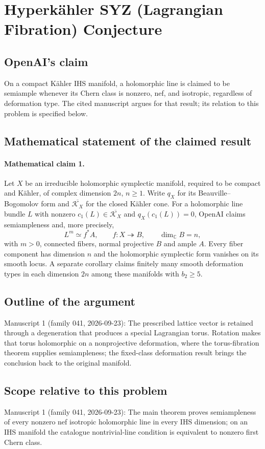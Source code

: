 \documentclass[11pt]{article}
\begin{document}
\section*{Hyperkähler SYZ (Lagrangian Fibration) Conjecture}

\subsection{OpenAI's claim}
On a compact Kähler IHS manifold, a holomorphic line is claimed to be semiample whenever its Chern class is nonzero, nef, and isotropic, regardless of deformation type. The cited manuscript argues for that result; its relation to this problem is specified below.

\subsection{Mathematical statement of the claimed result}
\paragraph{Mathematical claim 1.} Let $X$ be an irreducible holomorphic symplectic manifold, required to be compact and Kähler, of complex dimension $2n$, $n\ge1$. Write $q_X$ for its Beauville--Bogomolov form and $\overline{\mathcal K_X}$ for the closed Kähler cone. For a holomorphic line bundle $L$ with nonzero $c_1(L)\in\overline{\mathcal K_X}$ and $q_X(c_1(L))=0$, OpenAI claims semiampleness and, more precisely,
\[
L^m\simeq f^*A,\qquad f:X\twoheadrightarrow B,\qquad\dim_{\mathbb C}B=n,
\]
with $m>0$, connected fibers, normal projective $B$ and ample $A$. Every fiber component has dimension $n$ and the holomorphic symplectic form vanishes on its smooth locus. A separate corollary claims finitely many smooth deformation types in each dimension $2n$ among these manifolds with $b_2\ge5$.

\subsection{Outline of the argument}
Manuscript 1 (family 041, 2026-09-23): The prescribed lattice vector is retained through a degeneration that produces a special Lagrangian torus. Rotation makes that torus holomorphic on a nonprojective deformation, where the torus-fibration theorem supplies semiampleness; the fixed-class deformation result brings the conclusion back to the original manifold.

\subsection{Scope relative to this problem}
Manuscript 1 (family 041, 2026-09-23): The main theorem proves semiampleness of every nonzero nef isotropic holomorphic line in every IHS dimension; on an IHS manifold the catalogue nontrivial-line condition is equivalent to nonzero first Chern class.
\end{document}
